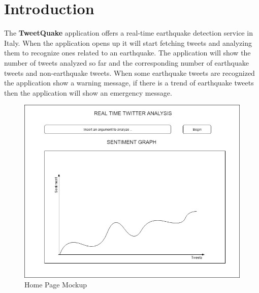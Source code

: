 \documentclass[a4paper, oneside]{article}
\begin{document}
\baselineskip 13pt

\begin{frontespizio} 
\Preambolo{\renewcommand{\frontpretitlefont}{\fontsize{15}{12}\scshape}}
\Rientro {1cm}
 \Punteggiatura {}
\end{frontespizio}

\clearpage

	\tableofcontents\thispagestyle{empty}
	\clearpage


\section{Introduction}
The \textbf{TweetQuake} application offers a real-time earthquake detection service in Italy. When the application opens up it will start fetching tweets and analyzing them to recognize ones related to an earthquake.
The application will show the number of tweets analyzed so far and the corresponding number of earthquake tweets and non-earthquake tweets. When some earthquake tweets are recognized the application show a warning message, if there is a trend of earthquake tweets then the application will show an emergency message.
\vspace{5mm}
\begin{figure}[h]
\centering
\includegraphics[width=\textwidth]{./images/diagrams/HomeMockup} 
\caption{Home Page Mockup}
\label{fig:mockup}
\end{figure}
\end{document}
